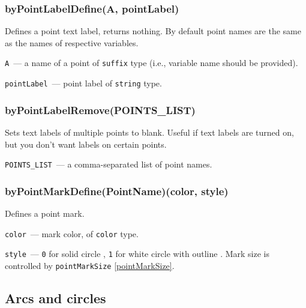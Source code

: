 \subsubsection{byPointLabelDefine(A, pointLabel)}\label{byPointLabelDefine}

	Defines a point text label, returns nothing. By default point names are the same as the names of respective variables.
	
	\texttt{A}~— a name of a point of \texttt{suffix} type  (i.e., variable name should be provided).
	
	\texttt{pointLabel}~— point label of \texttt{string} type.

\subsubsection{byPointLabelRemove(POINTS\_LIST)}\label{byPointLabelRemove}

	Sets text labels of multiple points to blank. Useful if text labels are turned on, but you don't want labels on certain points.

	\texttt{POINTS\_LIST}~— a comma-separated list of point names.

\subsubsection{byPointMarkDefine(PointName)(color, style)}\label{byPointMarkDefine}

	
	Defines a point mark.

	\texttt{color}~— mark color, of \texttt{color} type.

	\texttt{style}~— \texttt{0} for solid circle , \texttt{1} for white circle with outline . Mark size is controlled by \texttt{pointMarkSize} \ref{pointMarkSize}.
		

\subsection{Arcs and circles}



